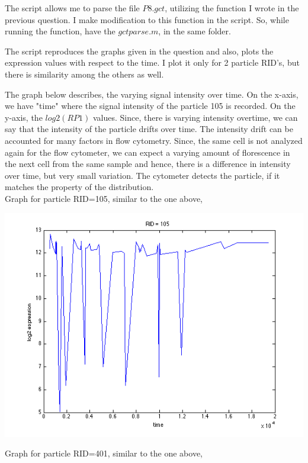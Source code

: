 \documentclass[11pt]{article}
\begin{document}
The script allows me to parse the file $P8.gct$, utilizing the function I wrote in the previous question. I make modification to this function in the script. So, while running the function, have the $gctparse.m$, in the same folder. 

The script reproduces the graphs given in the question and also, plots the expression values with respect to the time. I plot it only for 2 particle RID's, but there is similarity among the others as well. 

The graph below describes, the varying signal intensity over time. 
On the x-axis, we have "time" where the signal intensity of the particle 105 is recorded. On the y-axis, the $log2(RP1)$ values.
Since, there is varying intensity overtime, we can say that the intensity of the particle drifts over time.
The intensity drift can be accounted for many factors in flow cytometry. Since, the same cell is not analyzed again for the flow cytometer, we can expect a varying amount of florescence in the next cell from the same sample and hence, there is a difference in intensity over time, but very small variation. The cytometer detects the particle, if it matches the property of the distribution. \\

Graph for particle RID=105,	similar to the one above, 

\includegraphics[scale=0.5]{rid105.png}



Graph for particle RID=401,	similar to the one above, 
\end{document}
